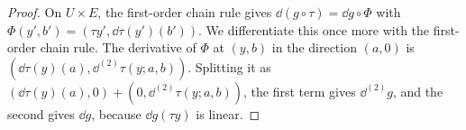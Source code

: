 \begin{proof}
  \leanok
  On $U \times E$, the first-order chain rule gives $\dd(g \circ \tau) = \dd g \circ \Phi$ with
  $\Phi(y', b') = (\tau y', \dd\tau(y')(b'))$. We differentiate this once more with the
  first-order chain rule. The derivative of $\Phi$ at $(y, b)$ in the direction $(a, 0)$ is
  $(\dd\tau(y)(a), \dd^{(2)}\tau(y; a, b))$. Splitting it as
  $(\dd\tau(y)(a), 0) + (0, \dd^{(2)}\tau(y; a, b))$, the first term gives $\dd^{(2)} g$, and
  the second gives $\dd g$, because $\dd g(\tau y)$ is linear.
\end{proof}
